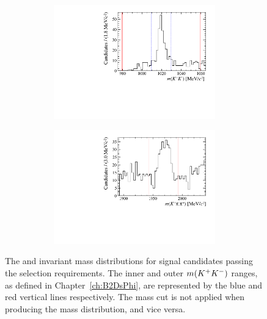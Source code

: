 \begin{figure}[!h]
\begin{subfigure}[t]{1.0\textwidth}
   \end{subfigure}   
   \begin{subfigure}[t]{1.0\textwidth}
   \centering
     \begin{subfigure}[t]{0.35\textwidth}
        \centering
        \includegraphics[width=1.0\textwidth]{figs/Selection/Phimass_KPiPi_B2DsPhi.pdf}
     \end{subfigure}
     \begin{subfigure}[t]{0.35\textwidth}
        \centering
        \includegraphics[width=1.0\textwidth]{figs/Selection/Dmass_KPiPi_B2DsPhi.pdf}
     \end{subfigure}
     \caption{\decay{\Bp}{(\decay{\Dsp}{\Kp\pim\pip})\phiz}}
   \end{subfigure}
   \caption{The \Dsp and \phiz invariant mass distributions for signal \decay{\Bp}{\Dsp\phiz} candidates passing the selection requirements. The inner and outer $m({{K}^+}{{K}^-})$ ranges, as defined in Chapter~\ref{ch:B2DsPhi}, are represented by the blue and red vertical lines respectively. The \Dsp mass cut is not applied when producing the \phiz mass distribution, and vice versa.}
   \label{fig:d_phi_mass_signal}   
\end{figure}
